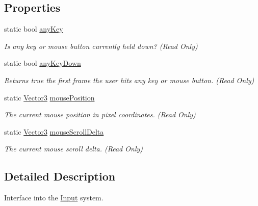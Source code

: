\subsection*{Properties}
\begin{DoxyCompactItemize}
\item 
static bool \mbox{\hyperlink{class_lua_1_1_input_a624c63ec2127ae1a70da0e8ac2a5742d}{any\+Key}}
\begin{DoxyCompactList}\small\item\em Is any key or mouse button currently held down? (Read Only) \end{DoxyCompactList}\item 
static bool \mbox{\hyperlink{class_lua_1_1_input_a2587110e95d4dff8d00d112fcade9631}{any\+Key\+Down}}
\begin{DoxyCompactList}\small\item\em Returns true the first frame the user hits any key or mouse button. (Read Only) \end{DoxyCompactList}\item 
static \mbox{\hyperlink{class_lua_1_1_vector3}{Vector3}} \mbox{\hyperlink{class_lua_1_1_input_ab5d4bcb7c637ec0760fc8ca8033ecec7}{mouse\+Position}}
\begin{DoxyCompactList}\small\item\em The current mouse position in pixel coordinates. (Read Only) \end{DoxyCompactList}\item 
static \mbox{\hyperlink{class_lua_1_1_vector3}{Vector3}} \mbox{\hyperlink{class_lua_1_1_input_ac508b474e85e336be67f2ad7ef94f751}{mouse\+Scroll\+Delta}}
\begin{DoxyCompactList}\small\item\em The current mouse scroll delta. (Read Only) \end{DoxyCompactList}\end{DoxyCompactItemize}


\subsection{Detailed Description}
Interface into the \mbox{\hyperlink{class_lua_1_1_input}{Input}} system. 


